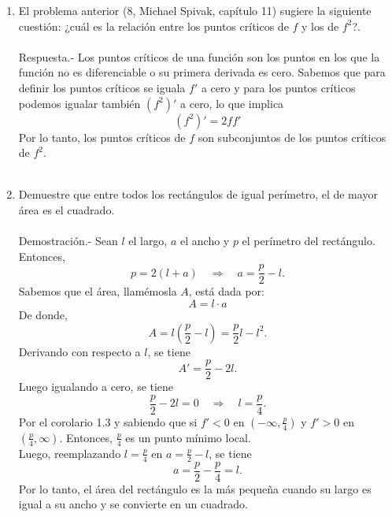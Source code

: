 \begin{enumerate}[\bfseries 1.]
\begin{enumerate}[(a)]
	\end{enumerate}

    \item El problema anterior (8, Michael Spivak, capítulo 11) sugiere la siguiente cuestión: ¿cuál es la relación entre los puntos críticos de $f$ y los de $f^2$?.\\\\
	Respuesta.-\; Los puntos críticos de una función son los puntos en los que la función no es diferenciable o su primera derivada es cero. Sabemos que para definir los puntos críticos se iguala  $f'$ a cero y para los puntos críticos podemos igualar también $\left(f^2\right)'$ a cero, lo que implica
	$$\left(f^2\right)'=2ff'$$
	Por lo tanto, los puntos críticos de $f$ son subconjuntos de los puntos críticos de $f^2$.\\\\

    \item Demuestre que entre todos los rectángulos de igual perímetro, el de mayor área es el cuadrado.\\\\
	Demostración.-\; Sean $l$ el largo, $a$ el ancho y $p$ el perímetro del rectángulo. Entonces,
	$$p=2(l+a)\quad \Rightarrow \quad a=\dfrac{p}{2}-l.$$
	Sabemos que el área, llamémosla $A$, está dada por:
	$$A=l \cdot a$$
	De donde,
	$$A=l\left(\dfrac{p}{2}-l\right)=\dfrac{p}{2}l-l^2.$$
	Derivando con respecto a $l$, se tiene
	$$A'=\dfrac{p}{2}-2l.$$
	Luego igualando a cero, se tiene
	$$\dfrac{p}{2}-2l=0\quad \Rightarrow \quad l=\dfrac{p}{4}.$$
	Por el corolario 1.3 y sabiendo que si $f'<0$ en $\left(-\infty,\frac{p}{4}\right)$  y $f'>0$ en $\left(\frac{p}{4},\infty\right)$. Entonces, $\frac{p}{4}$ es un punto mínimo local.\\

	Luego, reemplazando $l=\frac{p}{4}$ en $a=\frac{p}{2}-l$, se tiene
	$$a=\dfrac{p}{2}-\frac{p}{4}=l.$$
	Por lo tanto, el área del rectángulo es la más pequeña cuando su largo es igual a su ancho y se convierte en un cuadrado.\\\\


\end{enumerate}
